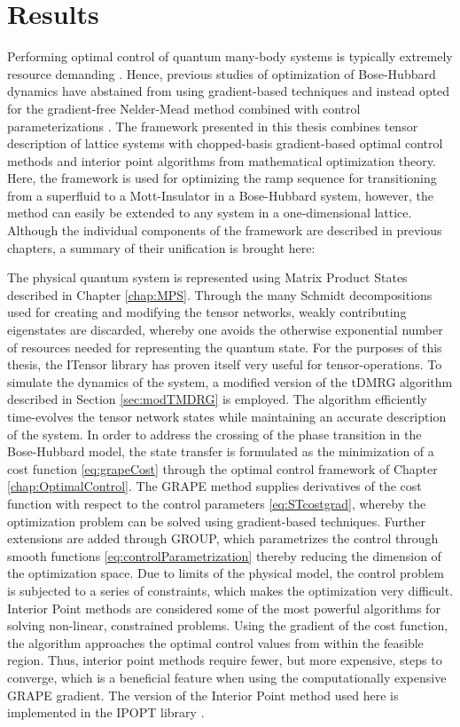 \chapter{Results}

Performing optimal control of quantum many-body systems is typically extremely resource demanding \cite{Mennemann2015}. Hence, previous studies of optimization of Bose-Hubbard dynamics have abstained from using gradient-based techniques and instead opted for the gradient-free Nelder-Mead method combined with control parameterizations \cite{Doria2011,FrankBloch}. The framework presented in this thesis combines tensor description of lattice systems with chopped-basis gradient-based optimal control methods and interior point algorithms from mathematical optimization theory. Here, the framework is used for optimizing the ramp sequence for transitioning from a superfluid to a Mott-Insulator in a Bose-Hubbard system, however, the method can easily be extended to any system in a one-dimensional lattice.
Although the individual components of the framework are described in previous chapters, a summary of their unification is brought here:

The physical quantum system is represented using Matrix Product States described in Chapter \ref{chap:MPS}. Through the many Schmidt decompositions used for creating and modifying the tensor networks, weakly contributing eigenstates are discarded, whereby one avoids the otherwise exponential number of resources needed for representing the quantum state. For the purposes of this thesis, the ITensor library \cite{ITensor} has proven itself very useful for tensor-operations.
To simulate the dynamics of the system, a modified version of the tDMRG algorithm described in Section \ref{sec:modTMDRG} is employed. The algorithm efficiently time-evolves the tensor network states while maintaining an accurate description of the system.
In order to address the crossing of the phase transition in the Bose-Hubbard model, the state transfer is formulated as the minimization of a cost function \eqref{eq:grapeCost} through the optimal control framework of Chapter \ref{chap:OptimalControl}. The GRAPE method supplies derivatives of the cost function with respect to the control parameters \eqref{eq:STcostgrad}, whereby the optimization problem can be solved using gradient-based techniques. Further extensions are added through GROUP, which parametrizes the control through smooth functions \eqref{eq:controlParametrization} thereby reducing the dimension of the optimization space.
Due to limits of the physical model, the control problem is subjected to a series of constraints, which makes the optimization very difficult. 
Interior Point methods are considered some of the most powerful algorithms for solving non-linear, constrained problems. Using the gradient of the cost function, the algorithm approaches the optimal control values from within the feasible region. Thus, interior point methods require fewer, but more expensive, steps to converge, which is a beneficial feature when using the computationally expensive GRAPE gradient. The version of the Interior Point method used here is implemented in the IPOPT library \cite{Wachter2006}.\\

